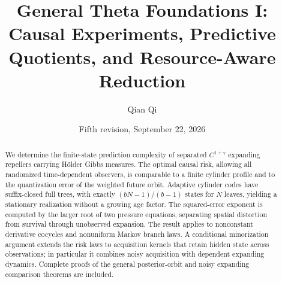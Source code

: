 
\title[General Theta Foundations I]{General Theta Foundations I: Causal Experiments, Predictive Quotients, and Resource-Aware Reduction}
\author{Qian Qi}
\date{Fifth revision, September 22, 2026}

\begin{abstract}
We determine the finite-state prediction complexity of separated
$C^{1+\gamma}$ expanding repellers carrying H\"older Gibbs measures.
The optimal causal risk, allowing all randomized time-dependent
observers, is comparable to a finite cylinder profile and to the
quantization error of the weighted future orbit. Adaptive cylinder
codes have suffix-closed full trees, with exactly $(bN-1)/(b-1)$
states for $N$ leaves, yielding a stationary realization without a
growing age factor. The squared-error exponent is computed by the larger root
of two pressure equations, separating spatial distortion from
survival through unobserved expansion. The result applies to
nonconstant derivative cocycles and nonuniform Markov branch laws.
A conditional minorization argument extends the risk laws to
acquisition kernels that retain hidden state across observations;
in particular it combines noisy acquisition with dependent
expanding dynamics. Complete proofs of the general posterior-orbit
and noisy expanding comparison theorems are included.
\end{abstract}
\maketitle
\tableofcontents
